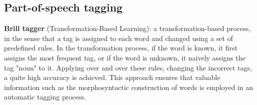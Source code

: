 \documentclass[12pt]{article}
\begin{document}
\subsection{Part-of-speech tagging}
\par \textbf{Brill tagger} (Transformation-Based Learning): a transformation-based process, in the sense that a tag is assigned to each word and changed using a set of predefined rules. In the transformation process, if the word is known, it first assigns the most frequent tag, or if the word is unknown, it naively assigns the tag "noun" to it. Applying over and over these rules, changing the incorrect tags, a quite high accuracy is achieved. This approach ensures that valuable information such as the morphosyntactic construction of words is employed in an automatic tagging process.
\end{document}
